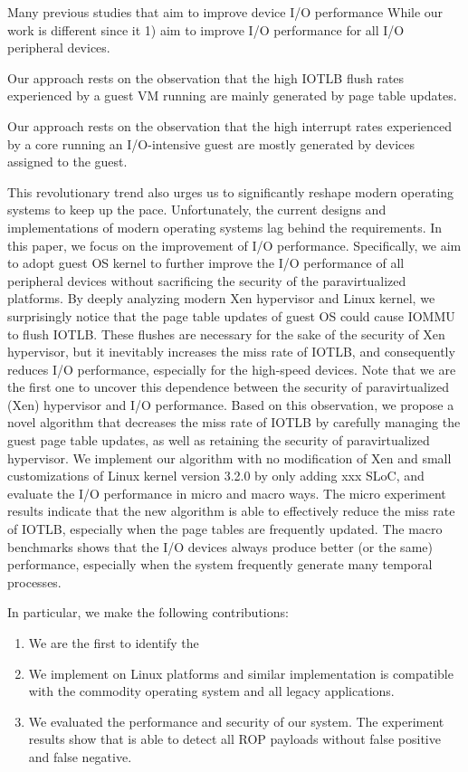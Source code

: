Many previous studies that aim to improve device I/O performance
While our work is different since it 1) aim to improve I/O performance for all I/O peripheral devices.

Our approach rests on the observation that the high IOTLB flush rates experienced by a guest VM running 
are mainly generated by page table updates. 

Our approach rests on the observation that the high interrupt
rates experienced by a core running an I/O-intensive guest are
mostly generated by devices assigned to the guest.

This revolutionary trend also urges us to significantly reshape modern operating systems to keep up the pace. Unfortunately, the current designs and implementations of modern operating systems lag behind the requirements.
In this paper, we focus on the improvement of I/O performance. Specifically, we aim to adopt guest OS kernel to further improve the I/O performance of all peripheral devices without sacrificing the security of the paravirtualized platforms. By deeply analyzing modern Xen hypervisor and Linux kernel, we surprisingly notice that the page table updates of guest OS could cause IOMMU to flush IOTLB. These flushes are necessary for the sake of the security of Xen hypervisor, but it inevitably increases the miss rate of IOTLB, and consequently reduces I/O performance, especially for the high-speed devices. Note that we are the first one to uncover this dependence between the security of paravirtualized (Xen) hypervisor and I/O performance. Based on this observation, we propose a novel algorithm that decreases the miss rate of IOTLB by carefully managing the guest page table updates, as well as retaining the security of paravirtualized hypervisor.
We implement our algorithm with no modification of Xen and small customizations of Linux kernel version 3.2.0 by only adding xxx SLoC, and evaluate the I/O performance in micro and macro ways. The micro experiment results indicate that the new algorithm is able to effectively reduce the miss rate of IOTLB, especially when the page tables are frequently updated. The macro benchmarks shows that the I/O devices always produce better (or the same) performance, especially when the system frequently generate many temporal processes.


In particular, we make the following contributions:
\begin{enumerate}
\item We are the first to identify the  
\item We implement \name on Linux platforms and similar implementation is compatible with the commodity operating system and all legacy applications.
\item We evaluated the performance and security of our system. The experiment results show that \name is able to detect all ROP payloads without false positive and false negative.
\end{enumerate}

